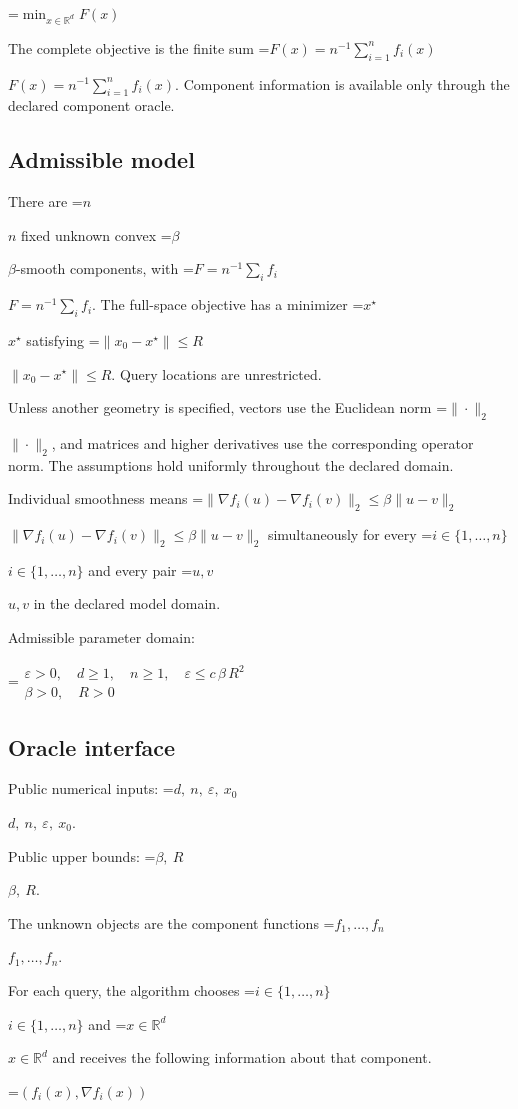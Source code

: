 \documentclass[10pt,a4paper]{article}
\newcommand{\AtlasMath}[1]{\par\begingroup\centering\setbox0=\hbox{$\displaystyle #1$}\ifdim\wd0>1.4\linewidth\typeout{ATLAS WIDE FORMULA: \the\wd0}\fi\ifdim\wd0>\linewidth\resizebox{\linewidth}{!}{\box0}\else\box0\fi\par\endgroup}
\newcommand{\AtlasInlineMath}[1]{\begingroup\setbox0=\hbox{$#1$}\ifdim\wd0>.4\linewidth\endgroup\AtlasMath{#1}\else\endgroup$#1$\fi}
\begin{document}
\AtlasMath{\min_{x\in \mathbb{R}^d}F(x)}


The complete objective is the finite sum \AtlasInlineMath{F(x)=n^{-1}\sum_{i=1}^n f_i(x)}. Component information is available only through the declared component oracle.

\subsection{Admissible model}
There are \AtlasInlineMath{n} fixed unknown convex \AtlasInlineMath{\beta}-smooth components, with \AtlasInlineMath{F=n^{-1}\sum_i f_i}. The full-space objective has a minimizer \AtlasInlineMath{x^\star} satisfying \AtlasInlineMath{\|x_0-x^\star\|\le R}. Query locations are unrestricted.

Unless another geometry is specified, vectors use the Euclidean norm \AtlasInlineMath{\|\cdot\|_2}, and matrices and higher derivatives use the corresponding operator norm. The assumptions hold uniformly throughout the declared domain.

Individual smoothness means \AtlasInlineMath{\|\nabla f_i(u)-\nabla f_i(v)\|_2\le\beta\|u-v\|_2} simultaneously for every \AtlasInlineMath{i\in\{1,\ldots,n\}} and every pair \AtlasInlineMath{u,v} in the declared model domain.

Admissible parameter domain:


\AtlasMath{\begin{gathered}\varepsilon > 0,\quad d \ge 1,\quad n \ge 1,\quad \varepsilon \le c\,\beta\,{R}^{2}\\\beta > 0,\quad R > 0\end{gathered}}


\subsection{Oracle interface}
Public numerical inputs: \AtlasInlineMath{d,\ n,\ \varepsilon,\ x_0}.

Public upper bounds: \AtlasInlineMath{\beta,\ R}.

The unknown objects are the component functions \AtlasInlineMath{f_1,\ldots,f_n}.

For each query, the algorithm chooses \AtlasInlineMath{i\in\{1,\ldots,n\}} and \AtlasInlineMath{x\in\mathbb R^d} and receives the following information about that component.


\AtlasMath{(f_i(x),\nabla f_i(x))}
\end{document}
